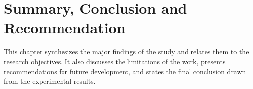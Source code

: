 \chapter[SUMMARY, CONCLUSION AND RECOMMENDATION]{Summary, Conclusion and Recommendation}

This chapter synthesizes the major findings of the study and relates them to the research objectives. It also discusses the limitations of the work, presents recommendations for future development, and states the final conclusion drawn from the experimental results.








